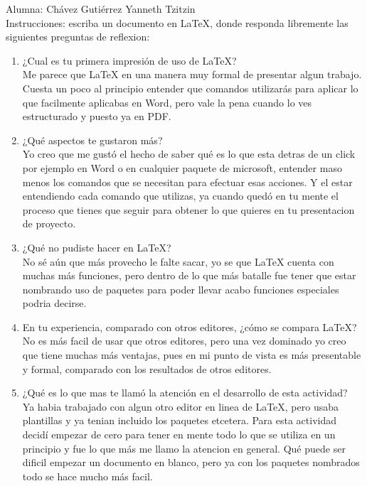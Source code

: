 \documentclass{article}
\begin{document}
\begin{doublespace}

Alumna: Chávez Gutiérrez Yanneth Tzitzin\\
Instrucciones: escriba un documento en LaTeX, donde responda libremente las siguientes preguntas de reflexion:

\begin{enumerate}
\item ¿Cual es tu primera impresión de uso de LaTeX?\\
Me parece que LaTeX en una manera muy formal de presentar algun trabajo. Cuesta un poco al principio entender que comandos utilizarás para aplicar lo que facilmente aplicabas en Word, pero vale la pena cuando lo ves estructurado y puesto ya en PDF. 

\item ¿Qué aspectos te gustaron más?\\
Yo creo que me gustó el hecho de saber qué es lo que esta detras de un click por ejemplo en Word o en cualquier paquete de microsoft, entender maso menos los comandos que se necesitan para efectuar esas acciones. Y el estar entendiendo cada comando que utilizas, ya cuando quedó en tu mente el proceso que tienes que seguir para obtener lo que quieres en tu presentacion de proyecto. 

\item ¿Qué no pudiste hacer en LaTeX?\\
No sé aún que más provecho le falte sacar, yo se que LaTeX cuenta con muchas más funciones, pero dentro de lo que más batalle fue tener que estar nombrando uso de paquetes para poder llevar acabo funciones especiales podria decirse. 

\item En tu experiencia, comparado con otros editores, ¿cómo se compara LaTeX?
No es más facil de usar que otros editores, pero una vez dominado yo creo que tiene muchas más ventajas, pues en mi punto de vista es más presentable y formal, comparado con los resultados de otros editores. 

\item ¿Qué es lo que mas te llamó la atención en el desarrollo de esta actividad?\\
Ya habia trabajado con algun otro editor en linea de LaTeX, pero usaba plantillas y ya tenian incluido los paquetes etcetera. Para esta actividad decidí empezar de cero para tener en mente todo lo que se utiliza en un principio y fue lo que más me llamo la atencion en general. Qué puede ser dificil empezar un documento en blanco, pero ya con los paquetes nombrados todo se hace mucho más facil. 


\end{enumerate}
\end{doublespace}
\end{document}
